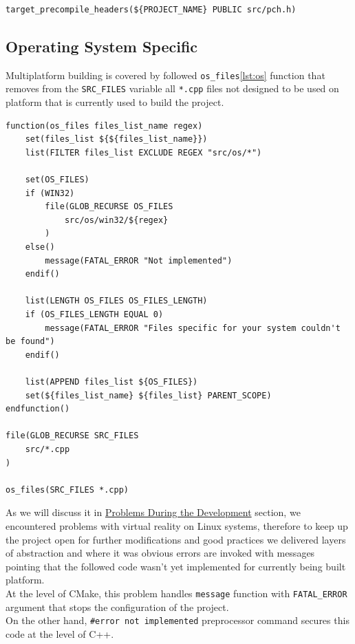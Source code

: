 \begin{lstlisting}[caption=Adding precompiled header(./engine/CMakeLists.txt)]
target_precompile_headers(${PROJECT_NAME} PUBLIC src/pch.h)
\end{lstlisting}

\subsection{Operating System Specific}
\label{sec:build_os}
Multiplatform building is covered by followed \texttt{os\_files}\ref{lst:os} function that removes from the \texttt{SRC\_FILES} variable all \texttt{*.cpp} files not designed to be used on platform that is currently used to build the project.
\label{lst:os}
\begin{lstlisting}[caption=os\_files function (./engine/CMakeLists.txt)]
function(os_files files_list_name regex)
    set(files_list ${${files_list_name}})
    list(FILTER files_list EXCLUDE REGEX "src/os/*")

    set(OS_FILES)
    if (WIN32)
        file(GLOB_RECURSE OS_FILES
            src/os/win32/${regex}
        )
    else()
        message(FATAL_ERROR "Not implemented")
    endif()

    list(LENGTH OS_FILES OS_FILES_LENGTH)
    if (OS_FILES_LENGTH EQUAL 0)
        message(FATAL_ERROR "Files specific for your system couldn't be found")
    endif()

    list(APPEND files_list ${OS_FILES})
    set(${files_list_name} ${files_list} PARENT_SCOPE)
endfunction()

file(GLOB_RECURSE SRC_FILES
    src/*.cpp
)

os_files(SRC_FILES *.cpp)
\end{lstlisting}
As we will discuss it in \hyperref[sec:problems]{Problems During the Development} section, we encountered problems with virtual reality on Linux systems, therefore to keep up the project open for further modifications and good practices we delivered layers of abstraction and where it was obvious errors are invoked with messages pointing that the followed code wasn't yet implemented for currently being built platform.\\ At the level of CMake, this problem handles \texttt{message} function with \texttt{FATAL\_ERROR} argument that stops the configuration of the project.\\ On the other hand, \texttt{\#error not implemented} preprocessor command secures this code at the level of C++.

